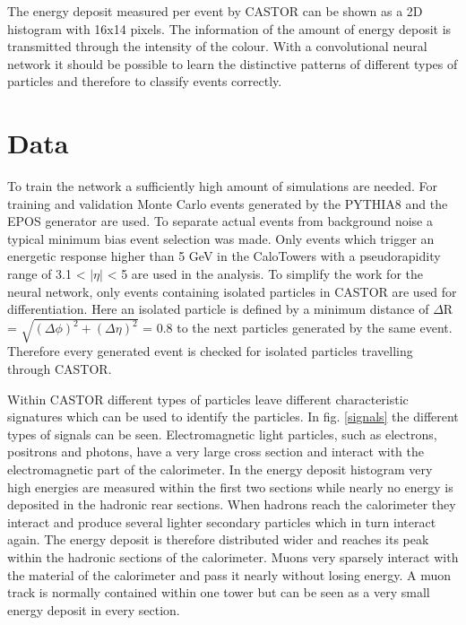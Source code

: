 The energy deposit measured per event by CASTOR can be shown as a 2D histogram with 16x14 pixels. The information of the amount of energy deposit is transmitted through the intensity of the colour. With a convolutional neural network it should be possible to learn the distinctive patterns of different types of particles and therefore to classify events correctly. 

\section{Data}
To train the network a sufficiently high amount of simulations are needed. For training and validation Monte Carlo events generated by the PYTHIA8 and the EPOS generator are used. To separate actual events from background noise a typical minimum bias event selection was made. Only events which trigger an energetic response higher than 5 GeV in the CaloTowers with a pseudorapidity range of 3.1 < $|\eta|$ < 5 are used in the analysis. To simplify the work for the neural network, only events containing isolated particles in CASTOR are used for differentiation. Here an isolated particle is defined by a minimum distance of $\Delta$R = $\sqrt{(\Delta \phi)^2 + (\Delta \eta)^2}$ = 0.8 to the next particles generated by the same event. Therefore every generated event is checked for isolated particles travelling through CASTOR.

Within CASTOR different types of particles leave different characteristic signatures which can be used to identify the particles. In fig. \ref{signals} the different types of signals can be seen. Electromagnetic light particles, such as electrons, positrons and photons, have a very large cross section and interact with the electromagnetic part of the calorimeter. In the energy deposit histogram very high energies are measured within the first two sections while nearly no energy is deposited in the hadronic rear sections.
When hadrons reach the calorimeter they interact and produce several lighter secondary particles which in turn interact again. The energy deposit is therefore distributed wider and reaches its peak within the hadronic sections of the calorimeter.
Muons very sparsely interact with the material of the calorimeter and pass it nearly without losing energy. A muon track is normally contained within one tower but can be seen as a very small energy deposit in every section.

